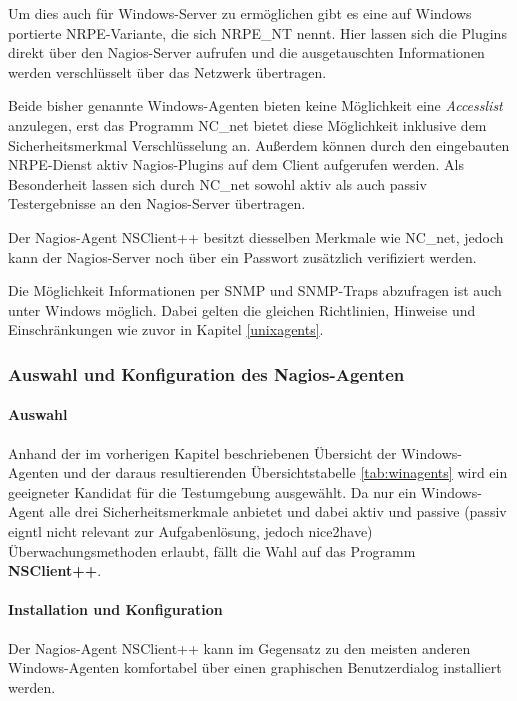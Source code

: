 Um dies auch für Windows-Server zu ermöglichen gibt es eine auf Windows portierte \gls{NRPE}-Variante, die sich NRPE\_NT nennt.
Hier lassen sich die Plugins direkt über den Nagios-Server aufrufen und die ausgetauschten Informationen werden verschlüsselt über das Netzwerk übertragen.

Beide bisher genannte Windows-Agenten bieten keine Möglichkeit eine \textit{Accesslist} anzulegen, erst das Programm NC\_net bietet diese Möglichkeit inklusive dem Sicherheitsmerkmal Verschlüsselung an.
Außerdem können durch den eingebauten \gls{NRPE}-Dienst aktiv Nagios-Plugins auf dem Client aufgerufen werden.
Als Besonderheit lassen sich durch NC\_net sowohl aktiv als auch passiv Testergebnisse an den Nagios-Server übertragen. 

Der Nagios-Agent NSClient++ besitzt diesselben Merkmale wie NC\_net, jedoch kann der Nagios-Server noch über ein Passwort zusätzlich verifiziert werden.

Die Möglichkeit Informationen per \gls{SNMP} und \gls{SNMP}-Traps abzufragen ist auch unter Windows möglich.
Dabei gelten die gleichen Richtlinien, Hinweise und Einschränkungen wie zuvor in Kapitel \ref{unixagents}.

\subsubsection{Auswahl und Konfiguration des Nagios-Agenten}

\paragraph{Auswahl}
Anhand der im vorherigen Kapitel beschriebenen Übersicht der Windows-Agenten und der daraus resultierenden Übersichtstabelle \ref{tab:winagents} wird ein geeigneter Kandidat für die Testumgebung ausgewählt.
Da nur ein Windows-Agent alle drei Sicherheitsmerkmale anbietet und dabei aktiv und passive (passiv eigntl nicht relevant zur Aufgabenlösung, jedoch nice2have) Überwachungsmethoden erlaubt, fällt die Wahl auf das Programm \textbf{NSClient++}.

\paragraph{Installation und Konfiguration}

Der Nagios-Agent NSClient++ kann im Gegensatz zu den meisten anderen Windows-Agenten komfortabel über einen graphischen Benutzerdialog installiert werden.

